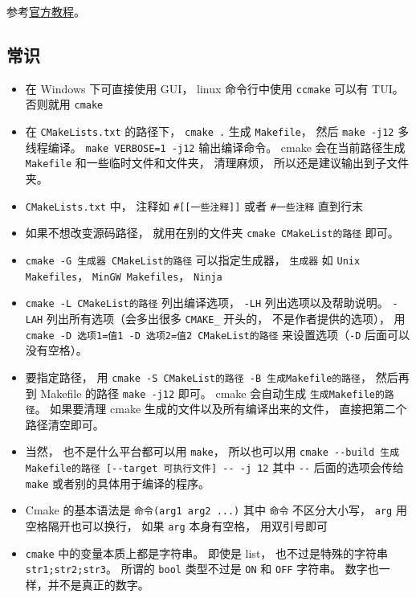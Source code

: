 


参考\href{https://cmake.org/cmake/help/latest/guide/tutorial/index.html}{官方教程}。

\subsection{常识}
\begin{itemize}
\item 在 Windows 下可直接使用 GUI， linux 命令行中使用 \verb`ccmake` 可以有 TUI。 否则就用 \verb`cmake`
\item 在 \verb`CMakeLists.txt` 的路径下， \verb`cmake .` 生成 \verb`Makefile`， 然后 \verb`make -j12` 多线程编译。 \verb`make VERBOSE=1 -j12` 输出编译命令。 cmake 会在当前路径生成 \verb`Makefile` 和一些临时文件和文件夹， 清理麻烦， 所以还是建议输出到子文件夹。
\item \verb`CMakeLists.txt` 中， 注释如 \verb`#[[一些注释]]` 或者 \verb`#一些注释` 直到行末
\item 如果不想改变源码路径， 就用在别的文件夹 \verb`cmake CMakeList的路径` 即可。
\item \verb`cmake -G 生成器 CMakeList的路径` 可以指定生成器， \verb`生成器` 如 \verb`Unix Makefiles`， \verb`MinGW Makefiles`， \verb`Ninja`
\item \verb`cmake -L CMakeList的路径` 列出编译选项， \verb`-LH` 列出选项以及帮助说明。 \verb`-LAH` 列出所有选项（会多出很多 \verb`CMAKE_` 开头的， 不是作者提供的选项）， 用 \verb`cmake -D 选项1=值1 -D 选项2=值2 CMakeList的路径` 来设置选项（\verb`-D` 后面可以没有空格）。
\item 要指定路径， 用 \verb`cmake -S CMakeList的路径 -B 生成Makefile的路径`， 然后再到 Makefile 的路径 \verb`make -j12` 即可。 cmake 会自动生成 \verb`生成Makefile的路径`。 如果要清理 cmake 生成的文件以及所有编译出来的文件， 直接把第二个路径清空即可。
\item 当然， 也不是什么平台都可以用 \verb`make`， 所以也可以用 \verb`cmake --build 生成Makefile的路径 [--target 可执行文件] -- -j 12` 其中 \verb`--` 后面的选项会传给 \verb`make` 或者别的具体用于编译的程序。
\item Cmake 的基本语法是 \verb`命令(arg1 arg2 ...)` 其中 \verb`命令` 不区分大小写， \verb`arg` 用空格隔开也可以换行， 如果 \verb`arg` 本身有空格， 用双引号即可
\item \verb`cmake` 中的变量本质上都是字符串。 即使是 list， 也不过是特殊的字符串 \verb`str1;str2;str3`。 所谓的 \verb`bool` 类型不过是 \verb`ON` 和 \verb`OFF` 字符串。 数字也一样，并不是真正的数字。

\end{itemize}
